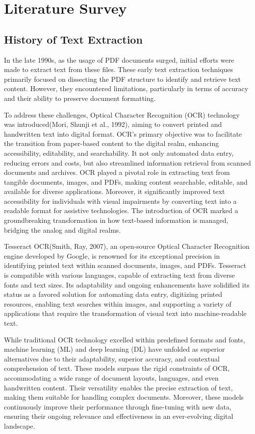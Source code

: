 \documentclass[fleqn,10pt]{thescipub} %
\begin{document}
\section{Literature Survey}

\subsection{History of Text Extraction}

In the late 1990s, as the usage of PDF documents surged, initial efforts were made to extract text from these files. These early text extraction techniques primarily focused on dissecting the PDF structure to identify and retrieve text content. However, they encountered limitations, particularly in terms of accuracy and their ability to preserve document formatting. 

To address these challenges, Optical Character Recognition (OCR) technology was introduced(Mori, Shunji et al., 1992), aiming to convert printed and handwritten text into digital format. OCR's primary objective was to facilitate the transition from paper-based content to the digital realm, enhancing accessibility, editability, and searchability. It not only automated data entry, reducing errors and costs, but also streamlined information retrieval from scanned documents and archives. OCR played a pivotal role in extracting text from tangible documents, images, and PDFs, making content searchable, editable, and available for diverse applications. Moreover, it significantly improved text accessibility for individuals with visual impairments by converting text into a readable format for assistive technologies. The introduction of OCR marked a groundbreaking transformation in how text-based information is managed, bridging the analog and digital realms.

Tesseract OCR(Smith, Ray, 2007), an open-source Optical Character Recognition engine developed by Google, is renowned for its exceptional precision in identifying printed text within scanned documents, images, and PDFs. Tesseract is compatible with various languages, capable of extracting text from diverse fonts and text sizes. Its adaptability and ongoing enhancements have solidified its status as a favored solution for automating data entry, digitizing printed resources, enabling text searches within images, and supporting a variety of applications that require the transformation of visual text into machine-readable text.

While traditional OCR technology excelled within predefined formats and fonts, machine learning (ML) and deep learning (DL) have unfolded as superior alternatives due to their adaptability, superior accuracy, and contextual comprehension of text. These models surpass the rigid constraints of OCR, accommodating a wide range of document layouts, languages, and even handwritten content. Their versatility enables the precise extraction of text, making them suitable for handling complex documents. Moreover, these models continuously improve their performance through fine-tuning with new data, ensuring their ongoing relevance and effectiveness in an ever-evolving digital landscape.
\end{document}
